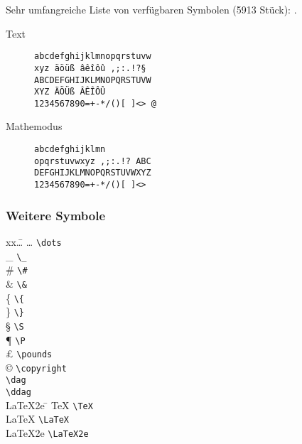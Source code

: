 \columnbreak

Sehr umfangreiche Liste von verfügbaren Symbolen (5913 Stück): \cite{Pakin}.

\begin{description}
	\item[Text] 
	\begin{verbatim}
abcdefghijklmnopqrstuvw
xyz äöüß âêîôû ,;:.!?§
ABCDEFGHIJKLMNOPQRSTUVW
XYZ ÄÖÜß ÂÊÎÔÛ
1234567890=+-*/()[ ]<> @
	\end{verbatim}
	\item[Mathemodus]
	\begin{verbatim}
abcdefghijklmn
opqrstuvwxyz ,;:.!? ABC
DEFGHIJKLMNOPQRSTUVWXYZ
1234567890=+-*/()[ ]<>
	\end{verbatim}
\end{description}

\subsubsection*{Weitere Symbole}
\negAbstand
\begin{multicols}{2}
\begin{tabbing}%
	xx\dots 							\= \kill
	\dots  							\>	\lstinline|\dots|		\\
	\_ 									\>	\lstinline|\_| 			\\
	\#									\>	\lstinline|\#|			\\
	\&									\>	\lstinline|\&|			\\
	\{ 									\>	\lstinline|\{|			\\
	\}  								\>	\lstinline|\}|			\\
	\S  								\>	\lstinline|\S|			\\
	\P 									\>	\lstinline|\P|			\\
	\pounds  						\>	\lstinline|\pounds|	\\
	\copyright 					\>	\lstinline|\copyright|	\\
	\dag  							\>	\lstinline|\dag|				\\
	\ddag  							\>	\lstinline|\ddag|				\\
\LaTeX2e						\= \kill
	\TeX 								\>	\lstinline|\TeX| 				\\
	\LaTeX 							\>	\lstinline|\LaTeX| 			\\
	\LaTeX2e 						\>	\lstinline|\LaTeX2e| 		
\end{tabbing}
\end{multicols}


